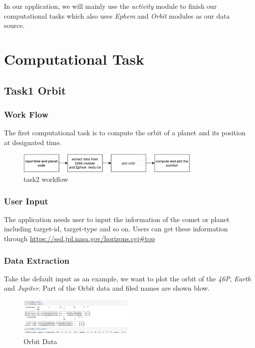 \documentclass{report}
\begin{document}
In our application, we will mainly use the \emph{activity} module to finish our computational tasks which also uses \emph{Ephem} and \emph{Orbit} modules as our data source.

\chapter{Computational Task}
\section{Task1 Orbit}
\subsection{Work Flow}
The first computational task is to compute the orbit of a planet and its position at designated time.
\begin{figure}[htb]
    \centering
    \includegraphics[width=0.8\textwidth]{task1}
    \caption{task2 workflow}
    \label{fig:task2}
\end{figure}

\subsection{User Input}
The application needs user to input the information of the comet or planet including target-id, target-type and so on. Users can get these information through \url{https://ssd.jpl.nasa.gov/horizons.cgi#top}
\subsection{Data Extraction}
Take the default input as an example, we want to plot the orbit of the \emph{46P}, \emph{Earth} and \emph{Jupiter}.
Part of the Orbit data and filed names are shown blow.
\begin{figure}[htb]
    \centering
    \includegraphics[width=0.5\textwidth]{DataExtraction}
    \caption{Orbit Data}
    \label{fig:OrbitData}
\end{figure}
\end{document}
